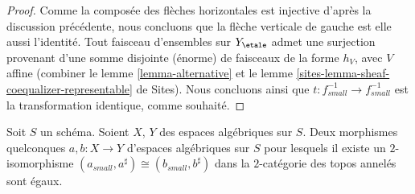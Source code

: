\begin{proof}
Comme la composée des flèches horizontales est injective
d'après la discussion précédente, nous concluons que la flèche verticale de gauche
est elle aussi l'identité. Tout faisceau d'ensembles sur
$Y_\etale$ admet une surjection provenant d'une somme disjointe (énorme) de faisceaux
de la forme $h_V$, avec $V$ affine (combiner le
lemme \ref{lemma-alternative}
et le
lemme \ref{sites-lemma-sheaf-coequalizer-representable} de Sites).
Nous concluons ainsi que $t : f_{small}^{-1} \to f_{small}^{-1}$
est la transformation identique, comme souhaité.
\end{proof}

\begin{lemma}
\label{lemma-faithful}
Soit $S$ un schéma.
Soient $X$, $Y$ des espaces algébriques sur $S$.
Deux morphismes quelconques $a, b : X \to Y$ d'espaces algébriques sur $S$
pour lesquels il existe un $2$-isomorphisme
$(a_{small}, a^\sharp) \cong (b_{small}, b^\sharp)$
dans la $2$-catégorie des topos annelés sont égaux.
\end{lemma}


